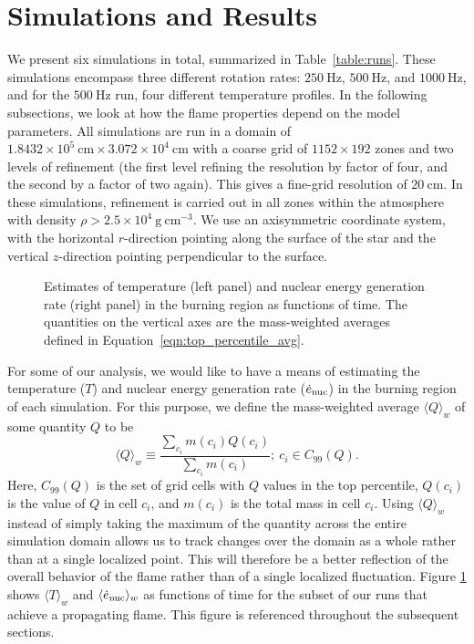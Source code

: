 \documentclass[preprint,times,tighten]{aastex63}
\newcommand{\enucdot}{\dot{e}_{\rm nuc}}
\newcommand{\repavg}[1]{\langle #1 \rangle_w}
\newcommand{\gcc}{\mathrm{g~cm^{-3} }}
\begin{document}
\section{Simulations and Results}\label{Sec:results}


We present six simulations in total, summarized in
Table~\ref{table:runs}.  These simulations encompass three different
rotation rates: $250~\mathrm{Hz}$, $500~\mathrm{Hz}$, and $1000~\mathrm{Hz}$, 
and for the $500~\mathrm{Hz}$ run, four
different temperature profiles.  In the following subsections, we look
at how the flame properties depend on the model parameters.  All
simulations are run in a domain of $1.8432\times 10^5~\mathrm{cm} \times
3.072\times 10^4~\mathrm{cm}$ with a coarse grid of $1152 \times 192$
zones and two levels of refinement (the first level refining the resolution 
by factor of four, and the second by a factor of two again).  This gives a
fine-grid resolution of $20~\mathrm{cm}$.  In these simulations, refinement 
is carried out in all zones within the atmosphere
with density $\rho > 2.5\times 10^4~\gcc$. We use an axisymmetric coordinate system, 
with the horizontal $r$-direction pointing along the surface of the star and the 
vertical $z$-direction pointing perpendicular to the surface.

\begin{figure}
	\caption{\label{fig:maxima}Estimates of temperature (left panel) and nuclear energy generation 
	rate (right panel) in the burning region as functions of time. The quantities on the vertical 
	axes are the mass-weighted averages defined in Equation~\ref{eqn:top_percentile_avg}.}
\end{figure}

For some of our analysis, we would like to have a means of estimating the temperature ($T$) and 
nuclear energy generation rate ($\enucdot$) in the burning region of each simulation. For this 
purpose, we define the mass-weighted average $\repavg{Q}$ of some quantity $Q$ to be
\begin{equation}
	\label{eqn:top_percentile_avg}
	\repavg{Q} \equiv \frac{\sum_{c_i} m(c_i) Q(c_i)}{\sum_{c_i} m(c_i)}; ~c_i \in C_{99}(Q).
\end{equation}
\noindent Here, $C_{99}(Q)$ is the set of grid cells with $Q$ values in the top percentile, 
$Q(c_i)$ is the value of $Q$ in cell $c_i$, and $m(c_i)$ is the total mass in cell $c_i$. 
Using $\repavg{Q}$ instead of simply taking the maximum of the quantity across the entire 
simulation domain allows us to track changes over the domain as a whole rather than at a single 
localized point. This will therefore be a better reflection of the overall behavior of the flame 
rather than of a single localized fluctuation. Figure \ref{fig:maxima} shows $\repavg{T}$ and 
$\repavg{\enucdot}$ as functions of time for the subset of our runs that achieve a propagating 
flame. This figure is referenced throughout the subsequent sections.
\end{document}
